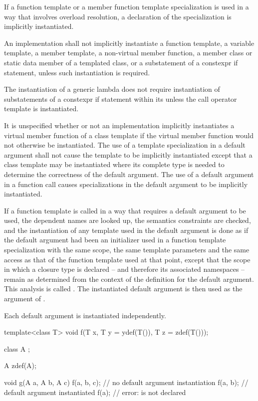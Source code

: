 \pnum
If a function template or a member function template specialization is used in
a way that involves overload resolution,
a declaration of the specialization is implicitly instantiated.

\pnum
An implementation shall not implicitly instantiate a function template,
a variable template,
a member template, a non-virtual member function, a member class or
static data member of a templated class, or a substatement of a constexpr if
statement, unless such instantiation is required.
\begin{note}
The instantiation of a generic lambda
does not require instantiation of
substatements of a constexpr if statement
within its 
unless the call operator template is instantiated.
\end{note}
It is unspecified whether or not an implementation implicitly instantiates a
virtual member function of a class template if the virtual member function would
not otherwise be instantiated.
The use of a template specialization in a default argument
shall not cause the template to be implicitly instantiated except that a
class template may be instantiated where its complete type is needed to determine
the correctness of the default argument.
The use of a default argument in a
function call causes specializations in the default argument to be implicitly
instantiated.

\pnum
If a function template
is called in a way that requires a default argument to be used,
the dependent names are looked up, the semantics constraints are checked,
and the instantiation of any template used in the default argument
is done as if the default argument had been
an initializer used in a function template specialization with the same scope,
the same template parameters and the same access as that of the function template
used at that point, except that the scope in which a closure type is
declared -- and therefore its associated namespaces --
remain as determined from the context of the definition for the default
argument.
This analysis is called
.
The instantiated default argument is then used as the argument of
.

\pnum
Each default argument is instantiated independently.
\begin{example}
\begin{codeblock}
template<class T> void f(T x, T y = ydef(T()), T z = zdef(T()));

class  A { };

A zdef(A);

void g(A a, A b, A c) {
  f(a, b, c);       // no default argument instantiation
  f(a, b);          // default argument  instantiated
  f(a);             // error:  is not declared
}
\end{codeblock}
\end{example}


